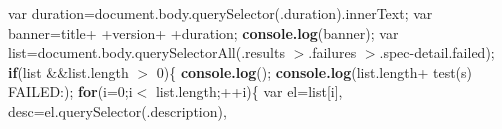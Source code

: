 {\begin{DoxyParamCaption}
                                                                                                                                                                                                       var duration=document.\+body.\+query\+Selector(\textquotesingle{}.duration\textquotesingle{}).inner\+Text;                                                                                                                                                                                                                   var banner=title+ \textquotesingle{} \textquotesingle{}+version+ \textquotesingle{} \textquotesingle{}+duration;                                                                                                                                                                                                                   {\bf console.\+log}(banner);                                                                                                                                                                                                                   var list=document.\+body.\+query\+Selector\+All(\textquotesingle{}.results $>$.failures $>$.spec-\/detail.\+failed\textquotesingle{});                                                                                                                                                                                                                   {\bf if}(list \&\&list.\+length $>$ 0)\{                                                                                                                                                                                                                                                   {\bf console.\+log}(\textquotesingle{}\textquotesingle{});                                                                                                                                                                                                                                                   {\bf console.\+log}(list.\+length+ \textquotesingle{}test(s) F\+A\+I\+L\+E\+D\+:\textquotesingle{});                                                                                                                                                                                                                                                   {\bf for}(i=0;i$<$ list.\+length;++i)\{                                                                                                                                                                                                                                                                                                                   var el=list\mbox{[}i\mbox{]},                                                                                                                                                                                                                                                                                                                                                                                   desc=el.\+query\+Selector(\textquotesingle{}.description\textquotesingle{}),                                                                                                                                          
\end{DoxyParamCaption}}
